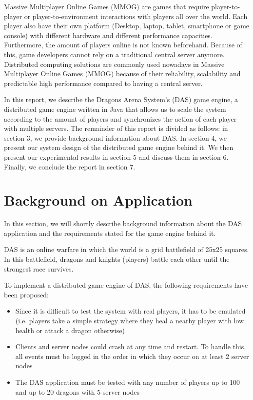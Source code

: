\documentclass[a4paper,10pt]{article}
\begin{document}
Massive Multiplayer Online Games (MMOG) are games that require player-to-player or player-to-environment interactions with players all over the world.
Each player also have their own platform (Desktop, laptop, tablet, smartphone or game console) with different hardware and different performance capacities.
Furthermore, the amount of players online is not known beforehand.
Because of this, game developers cannot rely on a traditional central server anymore.
Distributed computing solutions are commonly used nowadays in Massive Multiplayer Online Games (MMOG) because of their reliability,
scalability and predictable high performance compared to having a central server.

In this report, we describe the Dragons Arena System's (DAS) game engine,
a distributed game engine written in Java that allows us to scale the system according to the amount of players and synchronizes the action of each player with multiple servers.
The remainder of this report is divided as follows: in section 3, we provide background information about DAS.
In section 4, we present our system design of the distributed game engine behind it.
We then present our experimental results in section 5 and discuss them in section 6.
Finally, we conclude the report in section 7.


\section{Background on Application}
\label{sec:background}

In this section, we will shortly describe background information about the DAS application and the requirements stated for the game engine behind it.

DAS is an online warfare in which the world is a grid battlefield of 25x25 squares.
In this battlefield, dragons and knights (players) battle each other until the strongest race survives.

To implement a distributed game engine of DAS, the following requirements have been proposed:

\begin{itemize}
	\item Since it is difficult to test the system with real players, it has to be emulated (i.e. players take a simple strategy where they heal a nearby player with low health or attack a dragon otherwise)
	\item Clients and server nodes could crash at any time and restart. To handle this, all events must be logged in the order in which they occur on at least 2 server nodes
	\item The DAS application must be tested with any number of players up to 100 and up to 20 dragons with 5 server nodes
\end{itemize}
\end{document}
